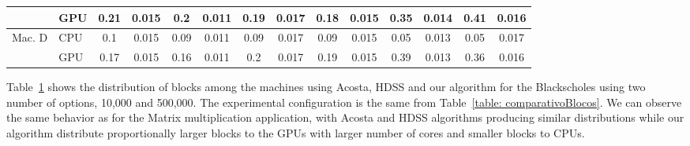 \documentclass[journal]{IEEEtran}
\begin{document}
\begin{table}[htb]
\begin{scriptsize}
\begin{tabular}{|l|l|l|l|l|l|l|l|l|l|l|l|l|l|}
\cline{2-14}
 & GPU & \multicolumn{1}{c|}{0.21} & \multicolumn{1}{c|}{0.015} & \multicolumn{1}{c|}{0.2} & \multicolumn{1}{c|}{0.011} & \multicolumn{1}{c|}{0.19} & \multicolumn{1}{c|}{0.017} & \multicolumn{1}{c|}{0.18} & \multicolumn{1}{c|}{0.015} & \multicolumn{1}{c|}{0.35} & \multicolumn{1}{c|}{0.014} & \multicolumn{1}{c|}{0.41} & \multicolumn{1}{c|}{0.016} \\ 
\hline
Mac. D & CPU & \multicolumn{1}{c|}{0.1} & \multicolumn{1}{c|}{0.015} & \multicolumn{1}{c|}{0.09} & \multicolumn{1}{c|}{0.011} & \multicolumn{1}{c|}{0.09} & \multicolumn{1}{c|}{0.017} & \multicolumn{1}{c|}{0.09} & \multicolumn{1}{c|}{0.015} & \multicolumn{1}{c|}{0.05} & \multicolumn{1}{c|}{0.013} & \multicolumn{1}{c|}{0.05} & \multicolumn{1}{c|}{0.017} \\ 
\cline{2-14}
 & GPU & \multicolumn{1}{c|}{0.17} & \multicolumn{1}{c|}{0.015} & \multicolumn{1}{c|}{0.16} & \multicolumn{1}{c|}{0.011} & \multicolumn{1}{c|}{0.2} & \multicolumn{1}{c|}{0.017} & \multicolumn{1}{c|}{0.19} & \multicolumn{1}{c|}{0.015} & \multicolumn{1}{c|}{0.39} & \multicolumn{1}{c|}{0.013} & \multicolumn{1}{c|}{0.36} & \multicolumn{1}{c|}{0.016} \\ 
\hline
\end{tabular}
\end{scriptsize}
\label{table: comparativoBlack}
\end{table}

Table~\ref{table: comparativoBlack} shows the distribution of blocks among the
machines using Acosta, HDSS and our algorithm for the Blackscholes using two
number of options, 10,000 and 500,000. The experimental configuration is the
same from Table~\ref{table: comparativoBlocos}. We can observe the same behavior
as for the Matrix multiplication application, with Acosta and HDSS algorithms
producing similar distributions while our algorithm distribute proportionally
larger blocks to the GPUs with larger number of cores and smaller blocks to
CPUs.
\end{document}
